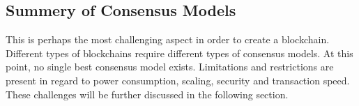 \subsection{Summery of Consensus Models}
\begin{table}[!ht] 
  
  \centering
  \label{tab:consensus}  
  \begin{center}
\end{center}
\end{table}


This is perhaps the most challenging aspect in order to create a blockchain. Different types of blockchains require different types of consensus models.  
At this point, no single best consensus model exists. Limitations and restrictions are present in regard to power consumption, scaling, security and transaction speed. These challenges will be further discussed in the following section. 


